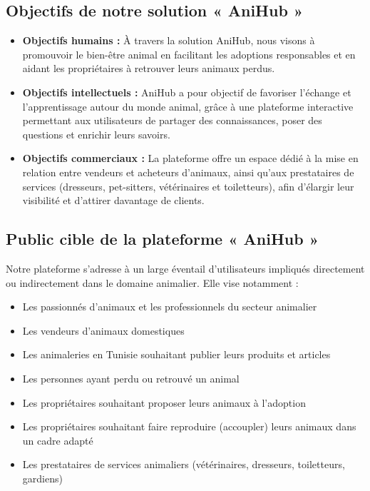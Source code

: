 \subsection{Objectifs de notre solution « AniHub »}

\begin{itemize}
\item \textbf{Objectifs humains :}  
À travers la solution AniHub, nous visons à promouvoir le bien-être animal en facilitant les adoptions responsables et en aidant les propriétaires à retrouver leurs animaux perdus.

\item \textbf{Objectifs intellectuels :}  
AniHub a pour objectif de favoriser l’échange et l’apprentissage autour du monde animal, grâce à une plateforme interactive permettant aux utilisateurs de partager des connaissances, poser des questions et enrichir leurs savoirs.

\item \textbf{Objectifs commerciaux :}  
La plateforme offre un espace dédié à la mise en relation entre vendeurs et acheteurs d’animaux, ainsi qu’aux prestataires de services (dresseurs, pet-sitters, vétérinaires et toiletteurs), afin d’élargir leur visibilité et d’attirer davantage de clients.
\end{itemize} 


\subsection{Public cible de la plateforme « AniHub »}

Notre plateforme s’adresse à un large éventail d’utilisateurs impliqués directement ou indirectement dans le domaine animalier. Elle vise notamment :

\begin{itemize}
    \item Les passionnés d’animaux et les professionnels du secteur animalier
    \item Les vendeurs d’animaux domestiques
    \item Les animaleries en Tunisie souhaitant publier leurs produits et articles
    \item Les personnes ayant perdu ou retrouvé un animal
    \item Les propriétaires souhaitant proposer leurs animaux à l’adoption
    \item Les propriétaires souhaitant faire reproduire (accoupler) leurs animaux dans un cadre adapté
    \item Les prestataires de services animaliers (vétérinaires, dresseurs, toiletteurs, gardiens)
\end{itemize} 

